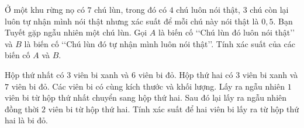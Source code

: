 \begin{bt}%
	Ở một khu rừng nọ có $7$ chú lùn, trong đó có $4$ chú luôn nói thật, $3$ chú còn lại luôn tự nhận mình nói thật nhưng xác suất để mỗi chú này nói thật là $0{,}5$. Bạn Tuyết gặp ngẫu nhiên một chú lùn. Gọi $A$ là biến cố \lq\lq Chú lùn đó  luôn nói thật\rq\rq \, và $B$ là biến cố \lq\lq Chú lùn đó tự nhận mình luôn nói thật\rq\rq. Tính xác suất của các biến cố $A$ và $B$.
\end{bt}

\begin{bt}%
	Hộp thứ nhất có $3$ viên bi xanh và $6$ viên bi đỏ. Hộp thứ hai có $3$ viên bi xanh và $7$ viên bi đỏ. Các viên bi có cùng kích thước và khối lượng. Lấy ra ngẫu nhiên $1$ viên bi từ hộp thứ nhất chuyển sang hộp thứ hai. Sau đó lại lấy ra ngẫu nhiên đồng thời $2$ viên bi  từ hộp thứ hai. Tính xác suất để hai viên bi lấy ra từ hộp thứ hai là bi đỏ.
\end{bt}

